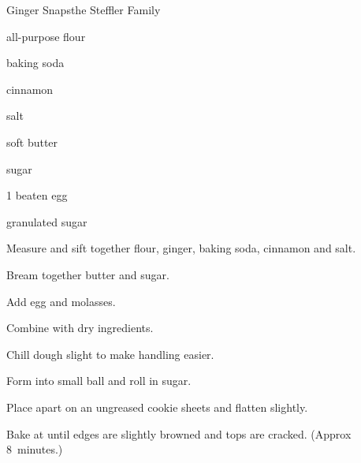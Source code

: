 \begin{recipe}{Ginger Snaps}{the Steffler Family}{}

\begin{ingredients}
\item {} all-purpose flour
\item {} 
\item {} baking soda
\item {} cinnamon
\item \tp{\quarter} salt
\item \C{\threequarter} soft butter
\item {} sugar
\item 1 beaten egg
\item \C{\half} 
\item granulated sugar
\end{ingredients}

\begin{directions}
\item Measure and sift together flour, ginger, baking soda, cinnamon and salt.
\item Bream together butter and sugar.
\item Add egg and molasses.
\item Combine with dry ingredients.
\item Chill dough slight to make handling easier.
\item Form into small ball and roll in sugar.
\item Place  apart on an ungreased cookie sheets and flatten slightly.
\item Bake at  until edges are slightly browned and tops are cracked. (Approx 8~minutes.)
\end{directions}
\end{recipe}
